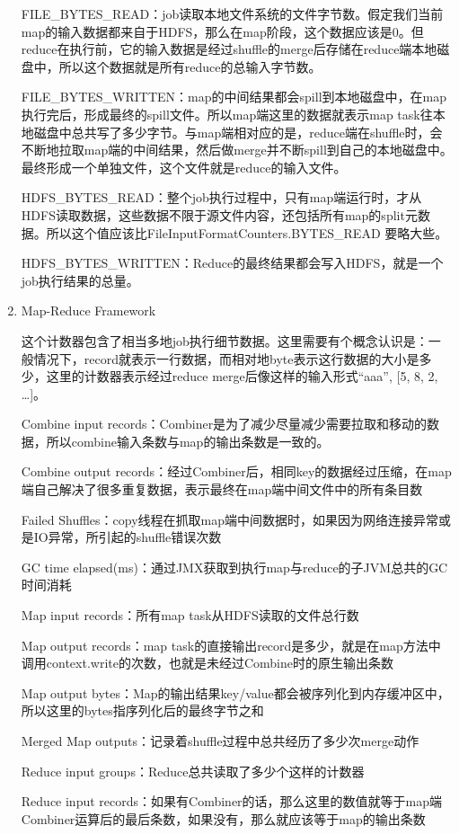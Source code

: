 \begin{enumerate}
FILE\_BYTES\_READ：job读取本地文件系统的文件字节数。假定我们当前map的输入数据都来自于HDFS，那么在map阶段，这个数据应该是0。但reduce在执行前，它的输入数据是经过shuffle的merge后存储在reduce端本地磁盘中，所以这个数据就是所有reduce的总输入字节数。 

FILE\_BYTES\_WRITTEN：map的中间结果都会spill到本地磁盘中，在map执行完后，形成最终的spill文件。所以map端这里的数据就表示map task往本地磁盘中总共写了多少字节。与map端相对应的是，reduce端在shuffle时，会不断地拉取map端的中间结果，然后做merge并不断spill到自己的本地磁盘中。最终形成一个单独文件，这个文件就是reduce的输入文件。 

HDFS\_BYTES\_READ：整个job执行过程中，只有map端运行时，才从HDFS读取数据，这些数据不限于源文件内容，还包括所有map的split元数据。所以这个值应该比FileInputFormatCounters.BYTES\_READ 要略大些。 

HDFS\_BYTES\_WRITTEN：Reduce的最终结果都会写入HDFS，就是一个job执行结果的总量。 


\item Map-Reduce Framework

这个计数器包含了相当多地job执行细节数据。这里需要有个概念认识是：一般情况下，record就表示一行数据，而相对地byte表示这行数据的大小是多少，这里的计数器表示经过reduce merge后像这样的输入形式{“aaa”, [5, 8, 2, …]}。 


Combine input records：Combiner是为了减少尽量减少需要拉取和移动的数据，所以combine输入条数与map的输出条数是一致的。 

Combine output records：经过Combiner后，相同key的数据经过压缩，在map端自己解决了很多重复数据，表示最终在map端中间文件中的所有条目数 

Failed Shuffles：copy线程在抓取map端中间数据时，如果因为网络连接异常或是IO异常，所引起的shuffle错误次数 

GC time elapsed(ms)：通过JMX获取到执行map与reduce的子JVM总共的GC时间消耗 

Map input records：所有map task从HDFS读取的文件总行数 

Map output records：map task的直接输出record是多少，就是在map方法中调用context.write的次数，也就是未经过Combine时的原生输出条数 

Map output bytes：Map的输出结果key/value都会被序列化到内存缓冲区中，所以这里的bytes指序列化后的最终字节之和 

Merged Map outputs：记录着shuffle过程中总共经历了多少次merge动作 

Reduce input groups：Reduce总共读取了多少个这样的计数器 

Reduce input records：如果有Combiner的话，那么这里的数值就等于map端Combiner运算后的最后条数，如果没有，那么就应该等于map的输出条数 


\end{enumerate}
